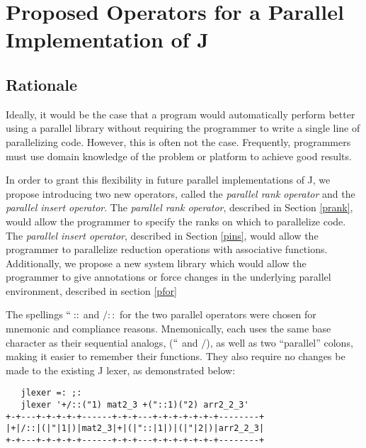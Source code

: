 \chapter{Proposed Operators for a Parallel Implementation of J} %
\label{paraop}

\section{Rationale}
Ideally, it would be the case that a program would automatically perform better using a parallel library 
without requiring the programmer to write a single line of parallelizing code. 
However, this is often not the case. %
Frequently, programmers must use domain knowledge of the problem or platform to achieve good results. 

In order to grant this flexibility in future parallel implementations of J, 
we propose introducing two new operators, called the \textit{parallel rank operator} 
and the \textit{parallel insert operator}.
The \textit{parallel rank operator}, described in Section \ref{prank}, 
would allow the programmer to specify the ranks on which to parallelize code.
The \textit{parallel insert operator}, described in Section \ref{pins}, 
would allow the programmer to parallelize reduction operations with associative functions.
Additionally, we propose a new system library
which would allow the programmer to give annotations or force changes in the underlying parallel environment,
described in section \ref{pfor}

The spellings $``::$ and $/::$ for the two parallel operators were chosen for mnemonic and compliance reasons.
Mnemonically, each uses the same base character as their sequential analogs, ($``$ and $/$), 
as well as two ``parallel'' colons, making it easier to remember their functions.
They also require no changes be made to the existing J lexer\cite{ioj}, 
as demonstrated below:

\begin{singlespacing}
\begin{small}
\begin{verbatim}
   jlexer =: ;:
   jlexer '+/::("1) mat2_3 +("::1)("2) arr2_2_3'
+-+---+-+-+-+-+------+-+-+---+-+-+-+-+-+-+--------+
|+|/::|(|"|1|)|mat2_3|+|(|"::|1|)|(|"|2|)|arr2_2_3|
+-+---+-+-+-+-+------+-+-+---+-+-+-+-+-+-+--------+
\end{verbatim}
\end{small}
\end{singlespacing}

